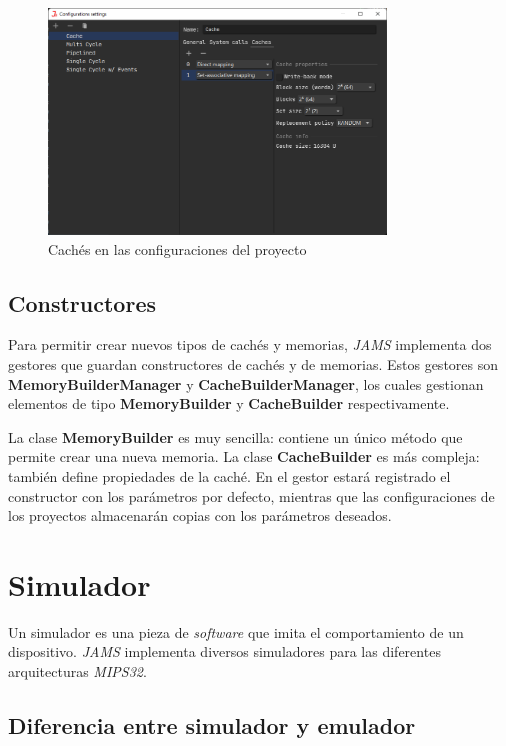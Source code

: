 \begin{figure}[H]
    \centering
    \includegraphics[width=0.8\textwidth]{images/mips/jams-caches}
    \caption{Cachés en las configuraciones del proyecto}
    \label{fig:jams-caches}
\end{figure}

\subsection{Constructores}\label{subsec:constructores}

Para permitir crear nuevos tipos de cachés y memorias,
\textit{JAMS} implementa dos gestores que guardan constructores de cachés
y de memorias.
Estos gestores son \textbf{MemoryBuilderManager} y \textbf{CacheBuilderManager},
los cuales gestionan elementos de tipo
\textbf{MemoryBuilder} y \textbf{CacheBuilder} respectivamente.

\noindent La clase \textbf{MemoryBuilder} es muy sencilla:
contiene un único método que permite crear una nueva memoria.
La clase \textbf{CacheBuilder} es más compleja:
también define propiedades de la caché.
En el gestor estará registrado el constructor con los parámetros por defecto,
mientras que las configuraciones de los proyectos almacenarán copias con los
parámetros deseados.


\section{Simulador}\label{sec:simulador}

Un simulador es una pieza de \textit{software} que imita el comportamiento
de un dispositivo.
\textit{JAMS} implementa diversos simuladores para las diferentes
arquitecturas \textit{MIPS32}.

\subsection{Diferencia entre simulador y emulador}
\label{subsec:diferencia-entre-simulador-y-emulador}

